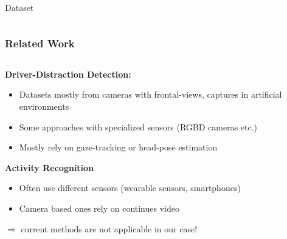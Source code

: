 \documentclass{beamer}
\begin{document}
\begin{frame}{Dataset}
\begin{columns}
\begin{column}{0.5\textwidth}
\begin{center}
            \end{center}
        \end{column}
        \end{columns}
    \end{frame}


	\begin{frame}
		\frametitle{Related Work}
		
		\begin{columns}
			\begin{column}{0.75\textwidth}
                \textbf{Driver-Distraction Detection:}
				\begin{itemize}
					\item Datasets mostly from cameras with frontal-views, captures in artificial environments  \cite{itsc:bergasa2008}
					\item Some approaches with specialized sensors (RGBD cameras etc.) \cite{Ragab2014}
					\item Mostly rely on gaze-tracking or head-pose estimation \cite{Dorazio} \cite{6957817}
				\end{itemize}		
                \textbf{Activity Recognition}
					\begin{itemize}
						\item Often use different sensors (wearable sensors, smartphones) \cite{6258525} \cite{6365160}
						\item Camera based ones rely on continues video \cite{1315249} \cite{1430826}
					\end{itemize}	
                \vspace{0.5cm}
                $\Rightarrow$ current methods are not applicable in our case!
			\end{column}
			\begin{column}{0.25\textwidth}  %
				\begin{center}

\end{center}
\end{column}
\end{columns}
\end{frame}
\end{document}

